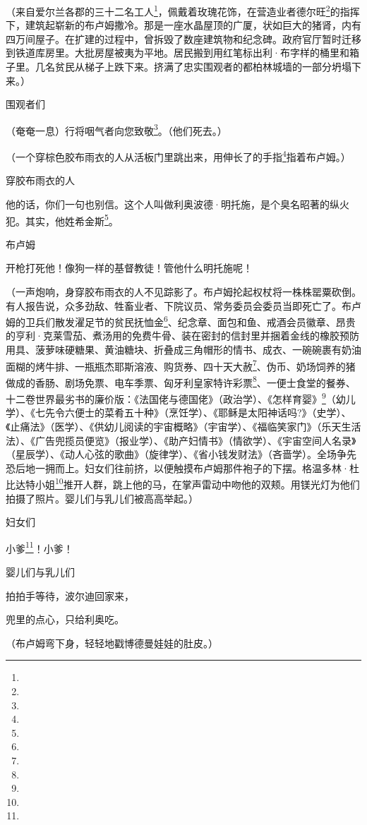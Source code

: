 \par （来自爱尔兰各郡的三十二名工人\footnote{}，佩戴着玫瑰花饰，在营造业者德尔旺\footnote{}的指挥下，建筑起崭新的布卢姆撒冷。那是一座水晶屋顶的广厦，状如巨大的猪肾，内有四万间屋子。在扩建的过程中，曾拆毁了数座建筑物和纪念碑。政府官厅暂时迁移到铁道库房里。大批房屋被夷为平地。居民搬到用红笔标出利·布字样的桶里和箱子里。几名贫民从梯子上跌下来。挤满了忠实围观者的都柏林城墙的一部分坍塌下来。）
\par 围观者们
\par （奄奄一息）行将咽气者向您致敬\footnote{}。（他们死去。）
\par （一个穿棕色胶布雨衣的人从活板门里跳出来，用伸长了的手指\footnote{}指着布卢姆。）
\par 穿胶布雨衣的人
\par 他的话，你们一句也别信。这个人叫做利奥波德·明托施，是个臭名昭著的纵火犯。其实，他姓希金斯\footnote{}。
\par 布卢姆
\par 开枪打死他！像狗一样的基督教徒！管他什么明托施呢！
\par （一声炮响，身穿胶布雨衣的人不见踪影了。布卢姆抡起权杖将一株株罂粟砍倒。有人报告说，众多劲敌、牲畜业者、下院议员、常务委员会委员当即死亡了。布卢姆的卫兵们散发濯足节的贫民抚恤金\footnote{}、纪念章、面包和鱼、戒酒会员徽章、昂贵的亨利·克莱雪茄、煮汤用的免费牛骨、装在密封的信封里并捆着金线的橡胶预防用具、菠萝味硬糖果、黄油糖块、折叠成三角帽形的情书、成衣、一碗碗裹有奶油面糊的烤牛排、一瓶瓶杰耶斯溶液、购货券、四十天大赦\footnote{}、伪币、奶场饲养的猪做成的香肠、剧场免票、电车季票、匈牙利皇家特许彩票\footnote{}、一便士食堂的餐券、十二卷世界最劣书的廉价版：《法国佬与德国佬》（政治学）、《怎样育婴》\footnote{}（幼儿学）、《七先令六便士的菜肴五十种》（烹饪学）、《耶稣是太阳神话吗?》（史学）、《止痛法》（医学）、《供幼儿阅读的宇宙概略》（宇宙学）、《福临笑家门》（乐天生活法）、《广告兜揽员便览》（报业学）、《助产妇情书》（情欲学）、《宇宙空间人名录》（星辰学）、《动人心弦的歌曲》（旋律学）、《省小钱发财法》（吝啬学）。全场争先恐后地一拥而上。妇女们往前挤，以便触摸布卢姆那件袍子的下摆。格温多林·杜比达特小姐\footnote{}推开人群，跳上他的马，在掌声雷动中吻他的双颊。用镁光灯为他们拍摄了照片。婴儿们与乳儿们被高高举起。）
\par 妇女们
\par 小爹\footnote{}！小爹！
\par 婴儿们与乳儿们
\par 拍拍手等待，波尔迪回家来，
\par 兜里的点心，只给利奥吃。
\par （布卢姆弯下身，轻轻地戳博德曼娃娃的肚皮。）

